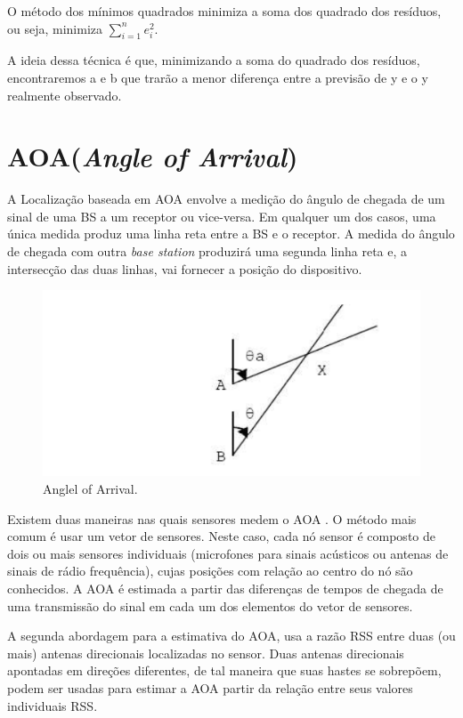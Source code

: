 O método dos mínimos quadrados minimiza a soma dos quadrado dos resíduos, ou seja, minimiza $\sum_{i=1}^n e_i^2$.

A ideia dessa técnica é que, minimizando a soma do quadrado dos resíduos, encontraremos a e b que trarão 
a menor diferença entre a previsão de y e o y realmente observado.

\section{AOA(\textit{Angle of Arrival})}
A Localização baseada em AOA envolve a medição do ângulo de chegada de um sinal de uma BS
a um receptor ou vice-versa. Em qualquer um dos casos, uma única medida produz uma linha reta 
entre a BS e o receptor. A medida do ângulo de chegada com outra \textit{base station}
produzirá uma segunda linha reta e, a intersecção das duas linhas, vai fornecer a posição
do dispositivo\cite{aoa3}.
	\begin{figure}[hb]
	\centering
	\includegraphics[scale=0.5]{images/aoa.png}
	\caption{Anglel of Arrival\cite{aoa3}. }
	\label{fig:aoa}
	\end{figure}
	
      Existem duas maneiras nas quais sensores medem o AOA \cite{aoa}. O método mais
comum é usar um vetor de sensores. Neste caso, cada nó sensor é
composto de dois ou mais sensores individuais (microfones para sinais acústicos ou antenas de sinais de rádio frequência),
cujas posições com relação ao centro do nó são conhecidos. A AOA é estimada a partir
das diferenças de tempos de chegada de uma transmissão do sinal em cada um dos elementos do vetor de sensores.

  A segunda abordagem para a estimativa do AOA, usa a razão RSS entre duas (ou
mais) antenas direcionais localizadas no sensor. Duas antenas direcionais apontadas em
direções diferentes, de tal maneira que suas hastes se sobrepõem, podem ser usadas para
estimar a AOA partir da relação entre seus valores individuais RSS.

